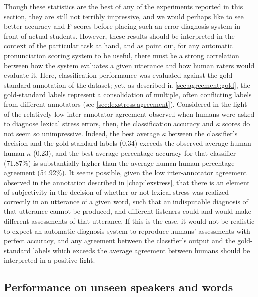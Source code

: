 Though these statistics are the best of any of the experiments reported in this section, they are still not terribly impressive, and we would perhaps like to see better accuracy and F-scores before placing such an error-diagnosis system in front of actual students. 
	However, these results should be interpreted in the context of the particular task at hand, and as \textcite[pp.~15-16]{Neri2002} point out, for any automatic pronunciation scoring system to be useful, there must be a strong correlation between how the system evaluates a given utterance and how human raters would evaluate it.
	Here, classification performance was evaluated against the gold-standard annotation of the dataset; yet, as described in \cref{sec:agreement:gold}, the gold-standard labels represent a consolidation of multiple, often conflicting labels from different annotators (see \cref{sec:lexstress:agreement}).
Considered in the light of the relatively low inter-annotator agreement observed when humans were asked to 
diagnose lexical stress errors, then,
the classification accuracy and $\kappa$ scores do not seem so unimpressive. Indeed, the best average $\kappa$ between the classifier's decision and the gold-standard labels (0.34) exceeds the observed average human-human $\kappa$ (0.23), and the best average percentage accuracy for that classifier (71.87\%) is substantially higher than the average human-human percentage agreement (54.92\%).
		It seems possible, given the low inter-annotator agreement observed in the annotation described in \cref{chap:lexstress}, that there is an element of subjectivity in the decision of whether or not lexical stress was realized correctly in an utterance of a given word, such that an indisputable diagnosis of that utterance cannot be produced, and different listeners could and would make different assessments of that utterance. If this is the case, it would not be realistic to expect an automatic diagnosis system to reproduce humans' assessments with perfect accuracy, and any agreement between the classifier's output and the gold-standard labels which exceeds the average agreement between humans should be interpreted in a positive light. 



	\subsection{Performance on unseen speakers and words}
	\label{sec:classification:unseen}
	
